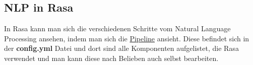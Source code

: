 \subsection{NLP in Rasa}\label{subsec:NLP-in-Rasa}

In Rasa kann man sich die verschiedenen Schritte vom Natural Language Processing ansehen, indem man sich die \hyperref[sec:pipeline]{Pipeline} ansieht.
Diese befindet sich in der \textbf{config.yml} Datei und dort sind alle Komponenten aufgelistet, die Rasa verwendet und man kann diese nach Belieben auch selbst bearbeiten.
